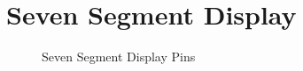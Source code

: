 \documentclass[a4paper,12pt]{article}
\begin{document}
\section{Seven Segment Display}
\begin{flushleft}
\begin{figure}[H]
	\centering
	\caption{Seven Segment Display Pins \cite{terasic_2014}}
\end{figure}
\end{flushleft}
\newpage
\end{document}
